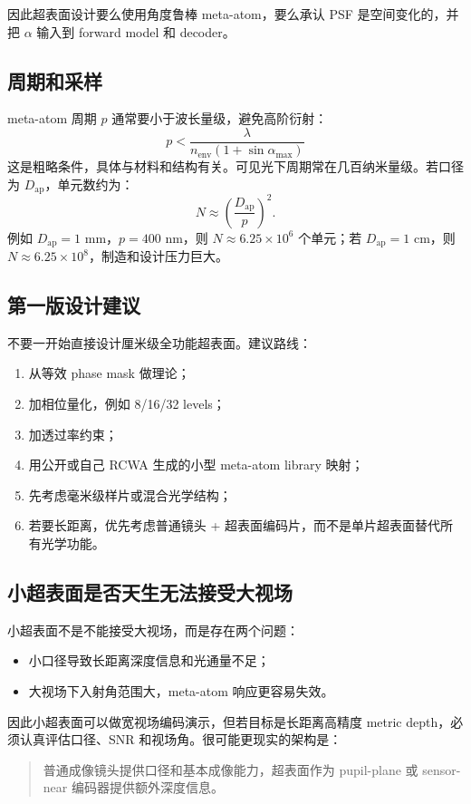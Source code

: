 \documentclass[11pt,a4paper,fontset=none]{ctexart}
\begin{document}
因此超表面设计要么使用角度鲁棒 meta-atom，要么承认 PSF 是空间变化的，并把 $\alpha$ 输入到 forward model 和 decoder。

\subsection{周期和采样}

meta-atom 周期 $p$ 通常要小于波长量级，避免高阶衍射：
\begin{equation}
  p < \frac{\lambda}{n_{\mathrm{env}}(1+\sin\alpha_{\max})}
\end{equation}
这是粗略条件，具体与材料和结构有关。可见光下周期常在几百纳米量级。若口径为 $D_{\mathrm{ap}}$，单元数约为：
\begin{equation}
  N\approx \left(\frac{D_{\mathrm{ap}}}{p}\right)^2.
\end{equation}
例如 $D_{\mathrm{ap}}=1$ mm，$p=400$ nm，则 $N\approx6.25\times10^6$ 个单元；若 $D_{\mathrm{ap}}=1$ cm，则 $N\approx6.25\times10^8$，制造和设计压力巨大。

\subsection{第一版设计建议}

不要一开始直接设计厘米级全功能超表面。建议路线：
\begin{enumerate}
  \item 从等效 phase mask 做理论；
  \item 加相位量化，例如 8/16/32 levels；
  \item 加透过率约束；
  \item 用公开或自己 RCWA 生成的小型 meta-atom library 映射；
  \item 先考虑毫米级样片或混合光学结构；
  \item 若要长距离，优先考虑普通镜头 + 超表面编码片，而不是单片超表面替代所有光学功能。
\end{enumerate}

\subsection{小超表面是否天生无法接受大视场}

小超表面不是不能接受大视场，而是存在两个问题：
\begin{itemize}
  \item 小口径导致长距离深度信息和光通量不足；
  \item 大视场下入射角范围大，meta-atom 响应更容易失效。
\end{itemize}
因此小超表面可以做宽视场编码演示，但若目标是长距离高精度 metric depth，必须认真评估口径、SNR 和视场角。很可能更现实的架构是：
\begin{quote}
普通成像镜头提供口径和基本成像能力，超表面作为 pupil-plane 或 sensor-near 编码器提供额外深度信息。
\end{quote}
\end{document}
